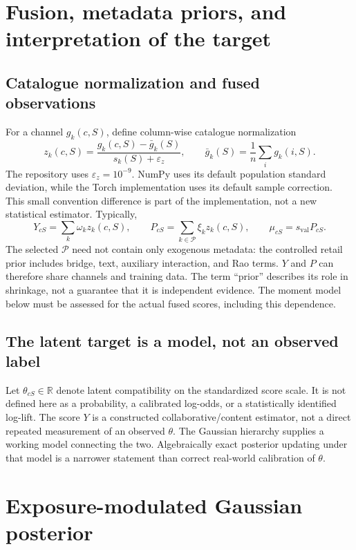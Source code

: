\documentclass[11pt,a4paper]{article}
\theoremstyle{remark}
\newcommand{\R}{\mathbb{R}}
\begin{document}
\section{Fusion, metadata priors, and interpretation of the target}
\subsection{Catalogue normalization and fused observations}
For a channel $g_k(c,S)$, define column-wise catalogue normalization
\begin{equation}
 z_k(c,S)=\frac{g_k(c,S)-\bar g_k(S)}{s_k(S)+\varepsilon_z},
 \qquad \bar g_k(S)=\frac1n\sum_i g_k(i,S).
 \label{eq:zscore}
\end{equation}
The repository uses $\varepsilon_z=10^{-9}$. NumPy uses its default
population standard deviation, while the Torch implementation uses its
default sample correction. This small convention difference is part of
the implementation, not a new statistical estimator.
Typically,
\begin{equation}
 Y_{cS}=\sum_k\omega_k z_k(c,S),\qquad
 P_{cS}=\sum_{k\in\mathcal P}\xi_k z_k(c,S),\qquad
 \mu_{cS}=s_{\mathrm{val}}P_{cS}.
 \label{eq:fusion}
\end{equation}
The selected $\mathcal P$ need not contain only exogenous metadata:
the controlled retail prior includes bridge, text, auxiliary interaction,
and Rao terms. $Y$ and $P$ can therefore share channels and training data.
The term ``prior'' describes its role in shrinkage, not a guarantee that
it is independent evidence. The moment model below must be assessed for
the actual fused scores, including this dependence.

\subsection{The latent target is a model, not an observed label}
Let $\theta_{cS}\in\R$ denote latent compatibility on the standardized
score scale. It is not defined here as a probability, a calibrated
log-odds, or a statistically identified log-lift. The score $Y$ is a
constructed collaborative/content estimator, not a direct repeated
measurement of an observed $\theta$. The Gaussian hierarchy supplies a
working model connecting the two. Algebraically exact posterior updating
under that model is a narrower statement than correct real-world
calibration of $\theta$.

\section{Exposure-modulated Gaussian posterior}
\end{document}
